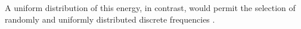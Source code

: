 A uniform distribution of
this energy, in contrast, would permit
the selection of
randomly and uniformly distributed discrete frequencies
\cite[Sect. IV-B]{article:ChernyakovaITUFFC2014}.

